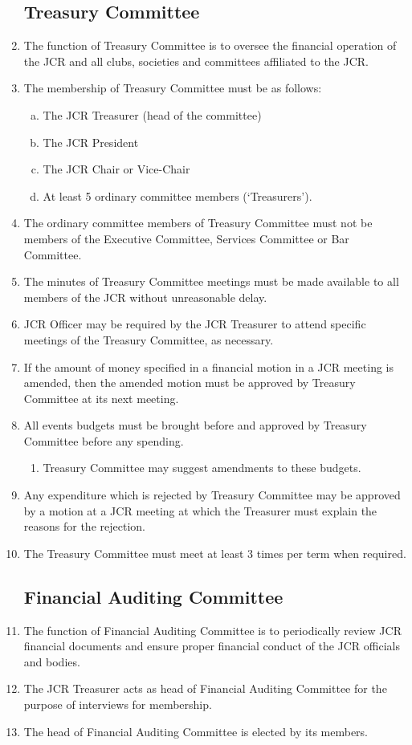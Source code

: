 \documentclass[12pt]{article}  %
\begin{document}
\begin{enumerate}
	\subsection{Treasury Committee}
	\item The function of Treasury Committee is to oversee the financial operation of the JCR and all clubs, societies and committees affiliated to the JCR.
	\item The membership of Treasury Committee must be as follows:
	\begin{enumerate}[(a)]
		\item The JCR Treasurer (head of the committee)
		\item The JCR President
		\item The JCR Chair or Vice-Chair 
		\item At least 5 ordinary committee members (‘Treasurers’).
	\end{enumerate}
	\item The ordinary committee members of Treasury Committee must not be members of the Executive Committee, Services Committee or Bar Committee.
	\item The minutes of Treasury Committee meetings must be made available to all members of the JCR without unreasonable delay.
	\item JCR Officer may be required by the JCR Treasurer to attend specific meetings of the Treasury Committee, as necessary.
	\item If the amount of money specified in a financial motion in a JCR meeting is amended, then the amended motion must be approved by Treasury Committee at its next meeting.
	\item All events budgets must be brought before and approved by Treasury Committee before any spending.
	\begin{enumerate}
		\item Treasury Committee may suggest amendments to these budgets.
	\end{enumerate}
	\item Any expenditure which is rejected by Treasury Committee may be approved by a motion at a JCR meeting at which the Treasurer must explain the reasons for the rejection.
	\item The Treasury Committee must meet at least 3 times per term when required.
	\subsection{Financial Auditing Committee}
	\item The function of Financial Auditing Committee is to periodically review JCR financial documents and ensure proper financial conduct of the JCR officials and bodies.
	\item The JCR Treasurer acts as head of Financial Auditing Committee for the purpose of interviews for membership.
	\item The head of Financial Auditing Committee is elected by its members.
\end{enumerate}
\end{document}

